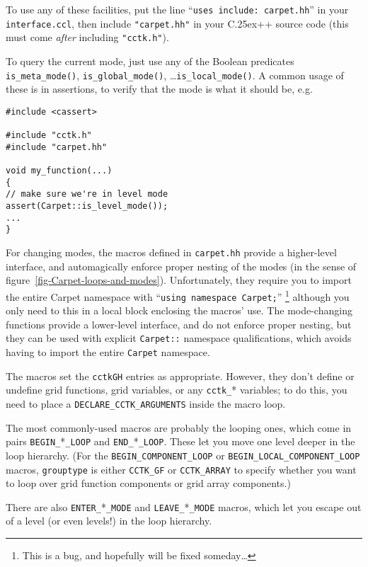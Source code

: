 \documentclass{article}
\def\Cplusplus{\hbox{C\raise.25ex\hbox{\footnotesize ++}}}
\def\eg{e.g.\hbox{}}
\begin{document}
To use any of these facilities, put the line
``\verb|uses include: carpet.hh|'' in your \verb|interface.ccl|,
then include \verb|"carpet.hh"| in your \Cplusplus{} source code
(this must come \emph{after} including \verb|"cctk.h"|).

To query the current mode, just use any of the Boolean predicates
\verb|is_meta_mode()|, \verb|is_global_mode()|, \dots \verb|is_local_mode()|.
A common usage of these is in assertions, to verify that the mode
is what it should be, \eg{}
\begin{verbatim}
#include <cassert>

#include "cctk.h"
#include "carpet.hh"

void my_function(...)
{
// make sure we're in level mode
assert(Carpet::is_level_mode());
...
}
\end{verbatim}

For changing modes, the macros defined in \verb|carpet.hh| provide
a higher-level interface, and automagically enforce proper nesting
of the modes (in the sense of figure~\ref{fig-Carpet-loops-and-modes}).
Unfortunately, they require you to import the entire Carpet namespace
with ``\verb|using namespace Carpet;|''%
\footnote{%
	 This is a bug, and hopefully will be fixed someday\dots
	 }%
{} although you only need to this in a local block enclosing the macros'
use.  The mode-changing functions provide a lower-level interface, and
do not enforce proper nesting, but they can be used with explicit
\verb|Carpet::| namespace qualifications, which avoids having to import
the entire \verb|Carpet| namespace.

The macros set the \verb|cctkGH| entries as appropriate.  However, they
don't define or undefine grid functions, grid variables, or any \verb|cctk_|*
variables; to do this, you need to place a \verb|DECLARE_CCTK_ARGUMENTS|
inside the macro loop.

The most commonly-used macros are probably the looping ones, which
come in pairs \verb|BEGIN_|*\verb|_LOOP| and \verb|END_|*\verb|_LOOP|.
These let you move one level deeper in the loop hierarchy.
(For the \verb|BEGIN_COMPONENT_LOOP| or \verb|BEGIN_LOCAL_COMPONENT_LOOP|
macros, \verb|grouptype| is either \verb|CCTK_GF| or \verb|CCTK_ARRAY|
to specify whether you want to loop over grid function components or
grid array components.)

There are also \verb|ENTER_|*\verb|_MODE| and \verb|LEAVE_|*\verb|_MODE|
macros, which let you escape out of a level (or even levels!) in the
loop hierarchy.
\end{document}
